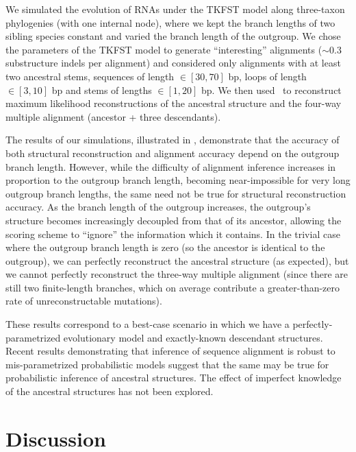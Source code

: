 \documentclass[10pt]{article}
\begin{document}
We simulated the evolution of RNAs under the TKFST model along
three-taxon phylogenies (with one internal node), where we kept the branch lengths of two
sibling species constant and varied the branch length of the
outgroup.  We chose the parameters of the TKFST model to
generate ``interesting'' alignments ($\sim 0.3$ substructure indels per
alignment) and considered only alignments with at least two ancestral
stems, sequences of length $\in [30, 70]$ bp, loops of length $\in [3,
10]$ bp and stems of lengths $\in [1, 20]$ bp.
We then used \indiegram\ to reconstruct maximum likelihood reconstructions of the ancestral structure and the four-way multiple alignment (ancestor + three descendants).

The results of our simulations, illustrated in ,
demonstrate that the accuracy of both structural
reconstruction and alignment accuracy depend on the outgroup
branch length.  However, while the difficulty of alignment inference
increases in proportion to the outgroup branch length, becoming
near-impossible for very long outgroup branch lengths, the same need
not be true for structural reconstruction accuracy.  As the branch
length of the outgroup increases, the outgroup's structure becomes increasingly decoupled from
that of its ancestor, allowing the scoring scheme to ``ignore'' the
information which it contains.
In the trivial case where the outgroup branch length is zero (so the ancestor is identical to the outgroup),
we can perfectly reconstruct the ancestral structure (as expected),
but we cannot perfectly reconstruct the three-way multiple alignment
 (since there are still two finite-length branches,
 which on average contribute a greater-than-zero rate of unreconstructable mutations).

These results correspond to a best-case scenario in which we
have a perfectly-parametrized evolutionary model and exactly-known descendant structures.
Recent results
demonstrating that inference of sequence alignment is
robust to mis-parametrized probabilistic models \cite{Lunter2007}
suggest that the same may be true for probabilistic inference of
ancestral structures.
The effect of imperfect knowledge of the ancestral structures has not been explored.

\newpage
\section*{Discussion}
\end{document}
